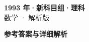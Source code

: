\documentclass[zihao=-4, a4paper]{ctexart}
\begin{document}
\begin{center}
  {\Large\bfseries 1993 年·新科目组·理科}\\[4pt]
  {\large 数学 · 解析版}
\end{center}
\medskip
{}

\clearpage
{}
\begin{center}{\Large\bfseries 参考答案与详细解析}\end{center}
\medskip

\end{document}
